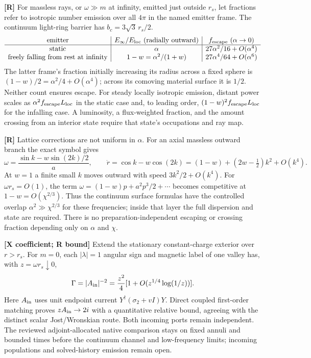 \textbf{[R]} For massless rays, or $\omega\gg m$ at infinity, emitted
just outside $r_s$, let fractions refer to isotropic number emission
over all $4\pi$ in the named emitter frame.  The continuum light-ring
barrier has $b_c=3\sqrt3\,r_s/2$.
\[
\begin{array}{c|c|c}
\text{emitter}&E_\infty/E_{\rm loc}\text{ (radially outward)}
 &f_{\rm escape}\ (\alpha\to0)\\ \hline
\text{static}&\alpha&27\alpha^2/16+O(\alpha^4)\\
\text{freely falling from rest at infinity}
 &1-w=\alpha^2/(1+w)&27\alpha^4/64+O(\alpha^6)
\end{array}
\]
The latter frame's fraction initially increasing its radius across a
fixed sphere is $(1-w)/2=\alpha^2/4+O(\alpha^4)$; across its comoving
material surface it is $1/2$.  Neither count ensures escape.
For steady locally isotropic emission, distant power
scales as $\alpha^2 f_{\rm escape}L_{\rm loc}$ in the static case and,
to leading order, $(1-w)^2 f_{\rm escape}L_{\rm loc}$ for the infalling
case.  A luminosity, a flux-weighted fraction, and the amount crossing
from an interior state require that state's occupations and ray map.

\textbf{[R]} Lattice corrections are not uniform in $\alpha$.
For an axial massless outward branch the exact symbol gives
\[
 \omega=\frac{\sin k-w\sin(2k)/2}{a},\qquad
 \dot r=\cos k-w\cos(2k)
 =(1-w)+(2w-\tfrac12)k^2+O(k^4).
\]
At $w=1$ a finite small $k$ moves outward with speed
$3k^2/2+O(k^4)$.  For $\omega r_s=O(1)$, the term
$\omega=(1-w)p+a^2p^3/2+\cdots$ becomes competitive at
$1-w=O(\chi^{2/3})$.  Thus the continuum surface formulas have the
controlled overlap $\alpha^2\gg\chi^{2/3}$ for these frequencies;
inside that layer the full dispersion and state are required.  There is
no preparation-independent escaping or crossing fraction depending only
on $\alpha$ and $\chi$.

\textbf{[X coefficient; R bound]} Extend the stationary constant-charge
exterior over $r>r_s$. For $m=0$, each $|\lambda|=1$ angular sign and
magnetic label of one valley has, with $z=\omega r_s\downarrow0$,
\[
 \Gamma=|A_{\rm in}|^{-2}
       =\frac{z^2}{4}[1+O(z^{1/4}\log(1/z))].
\]
Here $A_{\rm in}$ uses unit endpoint current
$Y^\dagger(\sigma_2+vI)Y$.
Direct coupled first-order matching proves $zA_{\rm in}\to2i$ with a
quantitative relative bound, agreeing with the distinct scalar
Jost/Wronskian route. Both incoming ports remain independent.
The reviewed adjoint-allocated native comparison stays on fixed annuli
and bounded times before the continuum channel and low-frequency limits;
incoming populations and solved-history emission remain open.

